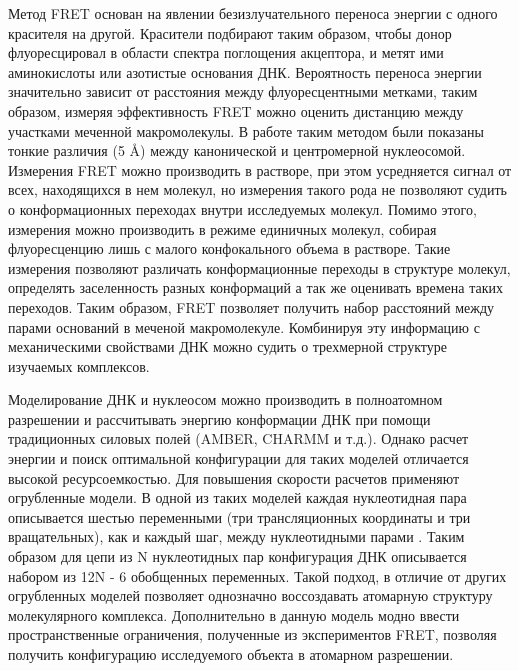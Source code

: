 Метод FRET основан на явлении безизлучательного переноса энергии с одного красителя на другой. Красители подбирают таким образом, чтобы донор флуоресцировал в области спектра поглощения акцептора, и метят ими аминокислоты или азотистые основания ДНК. Вероятность переноса энергии значительно зависит от расстояния между флуоресцентными метками, таким образом, измеряя эффективность FRET можно оценить дистанцию между участками меченной макромолекулы. В работе \cite{falk_cenp-c_2015} таким методом были показаны тонкие различия (5 \AA) между канонической и центромерной нуклеосомой. Измерения FRET можно производить в растворе, при этом усредняется сигнал от всех, находящихся в нем молекул, но измерения такого рода не позволяют судить о конформационных переходах внутри исследуемых молекул. Помимо этого, измерения можно производить в режиме единичных молекул, собирая флуоресценцию лишь с малого конфокального объема в растворе. Такие измерения позволяют различать конформационные переходы в структуре молекул, определять заселенность разных конформаций а так же оценивать времена таких переходов. Таким образом, FRET позволяет получить набор расстояний между парами оснований в меченой макромолекуле. Комбинируя эту информацию с механическими свойствами ДНК можно судить о трехмерной структуре изучаемых комплексов.

Моделирование ДНК и нуклеосом можно производить в полноатомном разрешении \cite{shaytan_combined_2015} и рассчитывать энергию конформации ДНК при помощи традиционных силовых полей (AMBER, CHARMM и т.д.). Однако расчет энергии и поиск оптимальной конфигурации для таких моделей отличается высокой ресурсоемкостью. Для повышения скорости расчетов применяют огрубленные модели. В одной из таких моделей каждая нуклеотидная пара описывается шестью переменными (три трансляционных координаты и три вращательных), как и каждый шаг, между нуклеотидными парами \cite{dickerson_definitions_1989}. Таким образом для цепи из N нуклеотидных пар конфигурация ДНК описывается набором из 12N - 6 обобщенных переменных. Такой подход, в отличие от других огрубленных моделей позволяет однозначно воссоздавать атомарную структуру молекулярного комплекса. Дополнительно в данную модель модно ввести пространственные ограничения, полученные из экспериментов FRET, позволяя получить конфигурацию исследуемого объекта в атомарном разрешении. 
